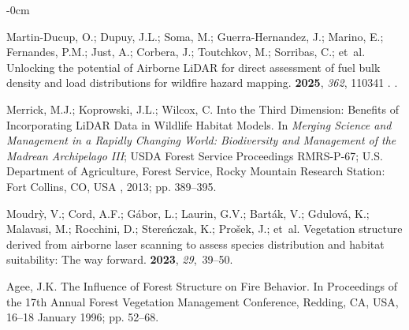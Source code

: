 \documentclass[remotesensing,article,accept,pdftex,moreauthors]{Definitions/mdpi}
\renewcommand{\hl}[1]{#1}
\begin{document}
\begin{adjustwidth}{-\extralength}{0cm}
  \begin{thebibliography}{999}

Martin-Ducup, O.; Dupuy, J.L.; Soma, M.; Guerra-Hernandez, J.; Marino, E.;
  Fernandes, P.M.; Just, A.; Corbera, J.; Toutchkov, M.; Sorribas, C.;  et~al.
\newblock Unlocking the potential of Airborne {LiDAR} for direct assessment of
  fuel bulk density and load distributions for wildfire hazard mapping.
 {\bf 2025}, {\em
  362}, \hl{110341}%
.
.

Merrick, M.J.; Koprowski, J.L.; Wilcox, C.
\newblock Into the Third Dimension: Benefits of Incorporating {LiDAR} Data in
  Wildlife Habitat Models.
\newblock In \emph{Merging Science and Management in a Rapidly
  Changing World: Biodiversity and Management of the Madrean Archipelago III}; USDA Forest Service Proceedings RMRS-P-67; U.S. Department of Agriculture, Forest Service, Rocky Mountain Research Station: \hl{Fort Collins, CO, USA}%
, 2013; pp. 389--395.

Moudr{\`y}, V.; Cord, A.F.; G{\'a}bor, L.; Laurin, G.V.; Bart{\'a}k, V.;
  Gdulov{\'a}, K.; Malavasi, M.; Rocchini, D.; Stere{\'n}czak, K.;
  Pro{\v{s}}ek, J.;  et~al.
\newblock Vegetation structure derived from airborne laser scanning to assess
  species distribution and habitat suitability: The way forward.
 {\bf 2023}, {\em 29},~39--50.

Agee, J.K.
\newblock The Influence of Forest Structure on Fire Behavior. In Proceedings of the \hl{17th Annual Forest Vegetation Management Conference, Redding, CA, USA, 16–18 January} %
 1996;
\newblock pp. 52--68.


\end{thebibliography}
\end{adjustwidth}
\end{document}
